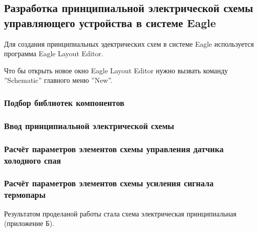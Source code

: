 \subsection{Разработка принципиальной электрической схемы управляющего устройства в системе Eagle}
Для создания принципиальных эдектрических схем в системе Eagle используется программа
Eagle Layout Editor.

Что бы открыть новое окно Eagle Layout Editor нужно вызвать команду ''Schematic''
главного меню ''New''.

\subsubsection{Подбор библиотек компонентов}

\subsubsection{Ввод принципиальной электрической схемы}

\subsubsection{Расчёт параметров элементов схемы управления датчика холодного спая}

\subsubsection{Расчёт параметров элементов схемы усиления сигнала термопары}

Результатом проделаной работы стала схема электрическая принципиальная (приложение Б).

